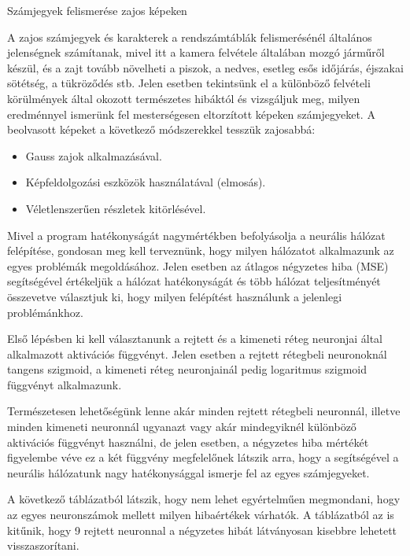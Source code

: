 Számjegyek felismerése zajos képeken 

A zajos számjegyek és karakterek a rendszámtáblák felismerésénél általános jelenségnek számítanak, mivel itt a kamera felvétele általában mozgó járműről készül, és a zajt tovább növelheti a piszok, a nedves, esetleg esős időjárás, éjszakai sötétség, a tükröződés stb. Jelen esetben tekintsünk el a különböző felvételi körülmények által okozott természetes hibáktól és vizsgáljuk meg, milyen eredménnyel ismerünk fel mesterségesen eltorzított képeken számjegyeket. A beolvasott képeket a következő módszerekkel tesszük zajosabbá: 

\begin{itemize}
\item Gauss zajok alkalmazásával. 
\item Képfeldolgozási eszközök használatával (elmosás). 
\item Véletlenszerűen részletek kitörlésével. 
\end{itemize}

Mivel a program hatékonyságát nagymértékben befolyásolja a neurális hálózat felépítése, gondosan meg kell terveznünk, hogy milyen hálózatot alkalmazunk az egyes problémák megoldásához. Jelen esetben az átlagos négyzetes hiba (MSE) segítségével értékeljük a hálózat hatékonyságát és több hálózat teljesítményét összevetve választjuk ki, hogy milyen felépítést használunk a jelenlegi problémánkhoz. 

Első lépésben ki kell választanunk a rejtett és a kimeneti réteg neuronjai által alkalmazott aktivációs függvényt. Jelen esetben a rejtett rétegbeli neuronoknál tangens szigmoid, a kimeneti réteg neuronjainál pedig logaritmus szigmoid függvényt alkalmazunk. 

Természetesen lehetőségünk lenne akár minden rejtett rétegbeli neuronnál, illetve minden kimeneti neuronnál ugyanazt vagy akár mindegyiknél különböző aktivációs függvényt használni, de jelen esetben, a négyzetes hiba mértékét figyelembe véve ez a két függvény megfelelőnek látszik arra, hogy a segítségével a neurális hálózatunk nagy hatékonysággal ismerje fel az egyes számjegyeket. 

A következő táblázatból látszik, hogy nem lehet egyértelműen megmondani, hogy az egyes neuronszámok mellett milyen hibaértékek várhatók. A táblázatból az is kitűnik, hogy 9 rejtett neuronnal a négyzetes hibát látványosan kisebbre lehetett visszaszorítani. 

